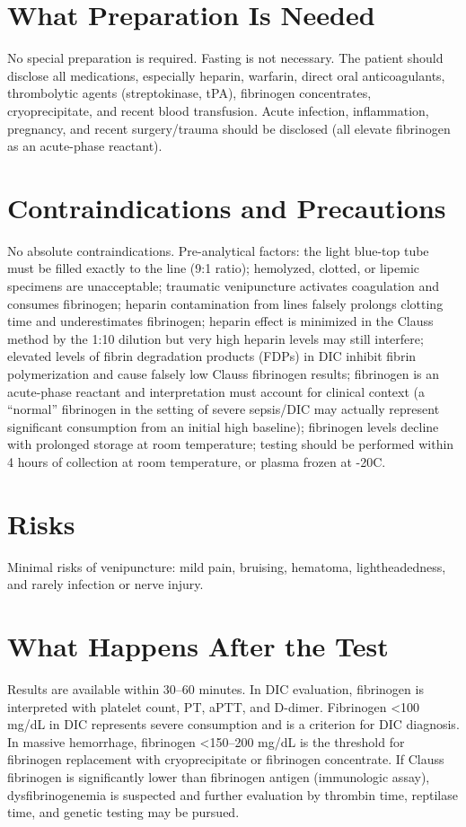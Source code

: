 \section*{What Preparation Is Needed}
No special preparation is required. Fasting is not necessary. The patient should disclose all medications, especially heparin, warfarin, direct oral anticoagulants, thrombolytic agents (streptokinase, tPA), fibrinogen concentrates, cryoprecipitate, and recent blood transfusion. Acute infection, inflammation, pregnancy, and recent surgery/trauma should be disclosed (all elevate fibrinogen as an acute-phase reactant).

\section*{Contraindications and Precautions}
No absolute contraindications. Pre-analytical factors: the light blue-top tube must be filled exactly to the line (9:1 ratio); hemolyzed, clotted, or lipemic specimens are unacceptable; traumatic venipuncture activates coagulation and consumes fibrinogen; heparin contamination from lines falsely prolongs clotting time and underestimates fibrinogen; heparin effect is minimized in the Clauss method by the 1:10 dilution but very high heparin levels may still interfere; elevated levels of fibrin degradation products (FDPs) in DIC inhibit fibrin polymerization and cause falsely low Clauss fibrinogen results; fibrinogen is an acute-phase reactant and interpretation must account for clinical context (a ``normal'' fibrinogen in the setting of severe sepsis/DIC may actually represent significant consumption from an initial high baseline); fibrinogen levels decline with prolonged storage at room temperature; testing should be performed within 4 hours of collection at room temperature, or plasma frozen at -20\textdegree{}C.

\section*{Risks}
Minimal risks of venipuncture: mild pain, bruising, hematoma, lightheadedness, and rarely infection or nerve injury.

\section*{What Happens After the Test}
Results are available within 30--60 minutes. In DIC evaluation, fibrinogen is interpreted with platelet count, PT, aPTT, and D-dimer. Fibrinogen <100 mg/dL in DIC represents severe consumption and is a criterion for DIC diagnosis. In massive hemorrhage, fibrinogen <150--200 mg/dL is the threshold for fibrinogen replacement with cryoprecipitate or fibrinogen concentrate. If Clauss fibrinogen is significantly lower than fibrinogen antigen (immunologic assay), dysfibrinogenemia is suspected and further evaluation by thrombin time, reptilase time, and genetic testing may be pursued.

